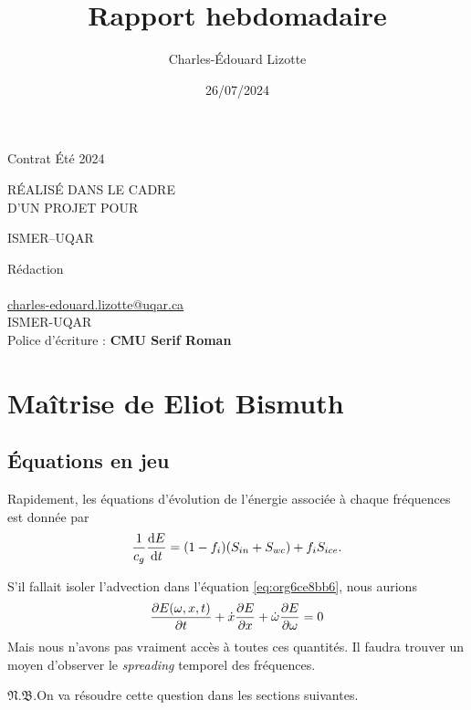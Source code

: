 \documentclass[10pt]{article}
\author{Charles-Édouard Lizotte}
\date{26/07/2024}
\title{Rapport hebdomadaire}
\makeatletter
\numberwithin{equation}{section}
\newcommand{\pt}{\hspace{1pt}} %
\newcommand{\nb}{\underline{{\footnotesize\EightStarConvex}\pt $\mathfrak{N.B.}$\vphantom{p}}\hspace{3pt}}
\newcommand{\mytitlepage}{
\begin{titlepage}
\begin{center}
{\Huge \thesubtitle \par}
\vspace{2cm}
{\Huge \MakeUppercase{\thetitle} \par}
\vspace{2cm}
RÉALISÉ DANS LE CADRE\\ D'UN PROJET POUR \par
\vspace{2cm}
{\Huge ISMER--UQAR \par}
\vspace{2cm}
{\thedate}
\end{center}
\vfill
Rédaction \\
{\theauthor}\\
\url{charles-edouard.lizotte@uqar.ca}\\
ISMER-UQAR\\
Police d'écriture : \textbf{CMU Serif Roman}
\end{titlepage}
}
\newcommand{\thesubtitle}{Contrat Été 2024}
\makeatother
\begin{document}
\mytitlepage
\tableofcontents\newpage
\section{Maîtrise de Eliot Bismuth}
\label{sec:orgbd387cd}

\subsection{Équations en jeu}
\label{sec:org89b4ec7}
Rapidement, les équations d'évolution de l'énergie associée à chaque fréquences est donnée par
\begin{equation}
\label{eq:org6ce8bb6}
   \frac{1}{c_g}\dv{E}{t} = (1-f_i)\qty(S_{in} + S_{wc}) + f_i S_{ice}.
\end{equation}

S'il fallait isoler l'advection dans l'équation \ref{eq:org6ce8bb6}, nous aurions
\begin{equation}
\label{eq:orgea0c11e}
   \pdv{E(\omega,x,t)}{t} + \dot{x}\pdv{E}{x} + \dot{\omega} \pdv{E}{\omega} = 0
\end{equation}
Mais nous n'avons pas vraiment accès à toutes ces quantités.
Il faudra trouver un moyen d'observer le \emph{spreading} temporel des fréquences.\bigskip

\nb On va résoudre cette question dans les sections suivantes.
\end{document}
